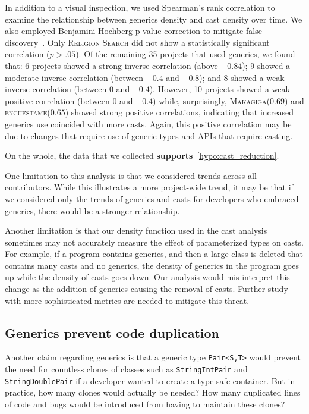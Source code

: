 \documentclass{svjour3}
\newcommand{\code}[1]{\texttt{#1}}
\newcommand{\encuestame}{\textsc{encuestame}\xspace}
\newcommand{\makagiga}{\textsc{Makagiga}\xspace}
\newcommand{\religion}{\textsc{Religion Search}\xspace}
\begin{document}
In addition to a visual inspection, we used Spearman's rank correlation to
examine the relationship between generics density and cast density over time. 
We also employed Benjamini-Hochberg p-value correction to mitigate false discovery~\cite{benjamini1995cfd}. 
Only \religion did not show a statistically significant correlation ($p > .05$).
Of the remaining 35 projects that used generics, we found that:
6 projects showed a strong inverse correlation (above $-0.84$);
9 showed a moderate inverse correlation (between $-0.4$ and $-0.8$); and
8 showed a weak inverse correlation (between $0$ and $-0.4$).
However,
10 projects showed a weak positive correlation (between $0$ and $-0.4$)
while, surprisingly, 
\makagiga ($0.69$) and \encuestame ($0.65$) showed strong positive correlations,
indicating that increased generics use coincided with more casts.
Again, this positive correlation may be due to changes
that require use of generic types and APIs that require casting.

On the whole, the data that we collected 
\textbf{supports}~\autoref{hypo:cast_reduction}.

One limitation to this analysis is that we considered 
trends across all contributors.
While this illustrates a more project-wide trend, it may be that if we considered only the
trends of generics and casts for developers who embraced generics, there would be a stronger
relationship.

Another limitation is that our density function used in the 
cast analysis sometimes may not accurately measure the effect of parameterized types on
casts.
For example, if a program contains generics, and then a large class is deleted that contains many casts and
no generics, the density of generics in the program goes up while the density of casts goes down.
Our analysis would mis-interpret this change as the addition of generics causing the removal of casts.
Further study with more sophisticated metrics are needed to mitigate this threat.


\subsection{Generics prevent code duplication}\label{sec:codedup}

Another claim regarding generics is that a generic type \code{Pair<S,T>} would
prevent the need for countless clones of classes such as \code{StringIntPair}
and \code{StringDoublePair} if a developer wanted to create a type-safe
container.  But in practice, how many clones would actually be needed?  How
many duplicated lines of code and bugs would be introduced from having to
maintain these clones?
\end{document}
